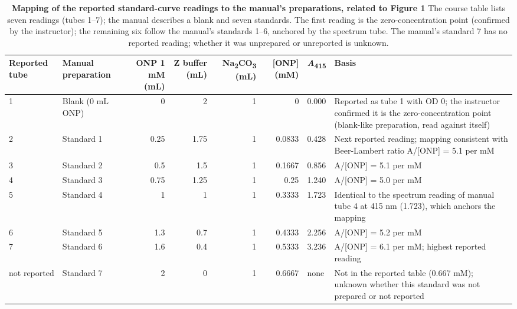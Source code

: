 \documentclass[9pt,twocolumn]{extarticle}
\newcommand{\Aa}{\textit{A}\textsubscript{415}}
\newcommand{\dash}{–}
\begin{document}
\begin{table}[h]
\caption{\textbf{Mapping of the reported standard-curve readings to the manual's preparations, related to Figure 1}\newline
The course table lists seven readings (tubes 1\dash 7); the manual describes a blank and seven standards. The first reading is the zero-concentration point (confirmed by the instructor); the remaining six follow the manual's standards 1\dash 6, anchored by the spectrum tube. The manual's standard 7 has no reported reading; whether it was unprepared or unreported is unknown.}
\scriptsize
\begin{tabularx}{\textwidth}{@{}llrrrrlX@{}}
\toprule
Reported tube & Manual preparation & ONP 1 mM (mL) & Z buffer (mL) & Na\textsubscript{2}CO\textsubscript{3} (mL) & [ONP] (mM) & \Aa & Basis \\
\midrule
1 & Blank (0 mL ONP) & 0 & 2 & 1 & 0 & 0.000 & Reported as tube 1 with OD 0; the instructor confirmed it is the zero-concentration point (blank-like preparation, read against itself) \\
2 & Standard 1 & 0.25 & 1.75 & 1 & 0.0833 & 0.428 & Next reported reading; mapping consistent with Beer-Lambert ratio A/[ONP] = 5.1 per mM \\
3 & Standard 2 & 0.5 & 1.5 & 1 & 0.1667 & 0.856 & A/[ONP] = 5.1 per mM \\
4 & Standard 3 & 0.75 & 1.25 & 1 & 0.25 & 1.240 & A/[ONP] = 5.0 per mM \\
5 & Standard 4 & 1 & 1 & 1 & 0.3333 & 1.723 & Identical to the spectrum reading of manual tube 4 at 415 nm (1.723), which anchors the mapping \\
6 & Standard 5 & 1.3 & 0.7 & 1 & 0.4333 & 2.256 & A/[ONP] = 5.2 per mM \\
7 & Standard 6 & 1.6 & 0.4 & 1 & 0.5333 & 3.236 & A/[ONP] = 6.1 per mM; highest reported reading \\
not reported & Standard 7 & 2 & 0 & 1 & 0.6667 & none & Not in the reported table (0.667 mM); unknown whether this standard was not prepared or not reported \\
\bottomrule
\end{tabularx}
\end{table}
\end{document}

